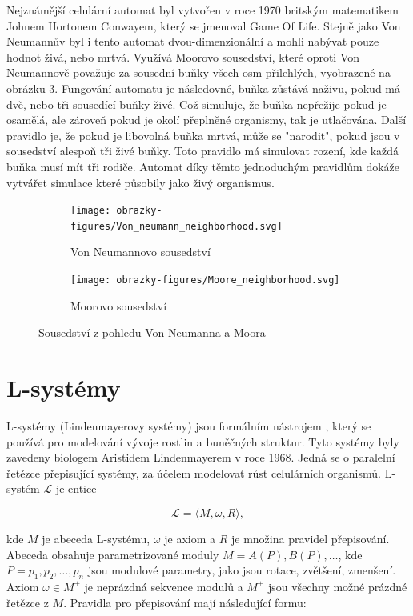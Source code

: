 Nejznámější celulární automat byl vytvořen v roce 1970 britským matematikem Johnem Hortonem Conwayem, který se jmenoval Game Of Life. Stejně jako Von Neumannův byl i tento automat dvou-dimenzionální a mohli nabývat pouze hodnot živá, nebo mrtvá. Využívá Moorovo sousedství, které oproti Von Neumannově považuje za sousední buňky všech osm přilehlých, vyobrazené na obrázku \ref{moore}. Fungování automatu je následovné, buňka zůstává naživu, pokud má dvě, nebo tři sousedící buňky živé. Což simuluje, že buňka nepřežije pokud je osamělá, ale zároveň pokud je okolí přeplněné organismy, tak je utlačována. Další pravidlo je, že pokud je libovolná buňka mrtvá, může se "narodit", pokud jsou v sousedství alespoň tři živé buňky. Toto pravidlo má simulovat rození, kde každá buňka musí mít tři rodiče. Automat díky těmto jednoduchým pravidlům dokáže vytvářet simulace které působily jako živý organismus. \cite{Gong2017}

\begin{figure}[h]
	\centering
	\begin{subfigure}{0.475\textwidth}
		\centering
		\texttt{[image: obrazky-figures/Von\_neumann\_neighborhood.svg]}
		\caption{Von Neumannovo sousedství}
		\label{vonNeumann}
	\end{subfigure}
	\begin{subfigure}{0.475\textwidth}
		\centering
		\texttt{[image: obrazky-figures/Moore\_neighborhood.svg]}
		\caption{Moorovo sousedství}
		\label{moore}
	\end{subfigure}
	\caption{Sousedství z pohledu Von Neumanna a Moora}
\end{figure}

\section{L-systémy}
\label{lsystems}
L-systémy (Lindenmayerovy systémy) jsou formálním nástrojem \cite{prusinkiewicz1986graphical}, který se používá pro modelování vývoje rostlin a buněčných struktur. Tyto systémy byly zavedeny biologem Aristidem Lindenmayerem v roce 1968. \cite{inverseL-systems} Jedná se o paralelní řetězce přepisující systémy, za účelem modelovat růst celulárních organismů. L-systém $\mathcal{L}$ je entice

\[\mathcal{L} = \langle M,\omega,R\rangle ,\]


kde $M$ je abeceda L-systému, $\omega$ je axiom a $R$ je množina pravidel přepisování. Abeceda obsahuje parametrizované moduly $M = {A(P),B(P),\ldots}$, kde $P=p_1,p_2,\ldots,p_n$ jsou modulové parametry, jako jsou rotace, zvětšení, zmenšení.
Axiom $\omega \in M^+$ je neprázdná sekvence modulů a $M^+$ jsou všechny možné prázdné řetězce z $M$. Pravidla pro přepisování mají následující formu:

